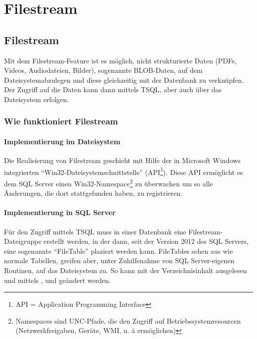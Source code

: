   \chapter{Filestream}
  \chaptertoc{}
  \cleardoubleevenpage

    \section{Filestream}
      Mit dem Filestream-Feature ist es möglich, nicht strukturierte Daten
      (PDFs, Videos, Audiodateien, Bilder), sogenannte BLOB-Daten, auf dem
      Dateisystemabzulegen und diese gleichzeitig mit der Datenbank zu
      verknüpfen. Der Zugriff auf die Daten kann dann mittels TSQL, aber auch
      über das Dateisystem erfolgen.
      \subsection{Wie funktioniert Filestream}
        \subsubsection{Implementierung im Dateisystem}
          Die Realisierung von Filestream geschieht mit Hilfe der in Microsoft
          Windows integrierten \enquote{Win32-Dateisystemschnittstelle}
          (API\footnote{API = Application Programming Interface}).
          Diese API ermöglicht es dem SQL Server einen
          Win32-Namespace\footnote{Namespaces sind UNC-Pfade, die den Zugriff
          auf Betriebssystemresourcen (Netzwerkfreigaben, Geräte, WMI, u. ä
          ermöglichen)} zu überwachen um so alle Änderungen, die dort
          stattgefunden haben, zu registrieren.
        
        \subsubsection{Implementierung in SQL Server}
          Für den Zugriff mittels TSQL muss in einer Datenbank eine
          Filestream-Dateigruppe erstellt werden, in der dann, seit
          der Version 2012 des SQL Servers, eine sogenannte \enquote{FileTable}
          plaziert werden kann. FileTables sehen aus wie normale Tabellen,
          greifen aber, unter Zuhilfenahme von SQL Server-eigenen Routinen, auf
          das Dateisystem zu. So kann mit \SELECT{} der Verzeichnisinhalt
          ausgelesen und mittels \INSERT, \UPDATE{} und \DELETE{} geändert werden.
        
